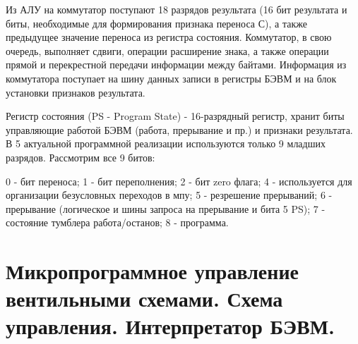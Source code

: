 \documentclass{article}
\begin{document}
Из АЛУ на коммутатор поступают 18 разрядов результата (16 бит результата и биты, необходимые для формирования признака переноса С), а также предыдущее значение переноса из регистра состояния. Коммутатор, в свою очередь, выполняет сдвиги, операции расширение знака, а также операции прямой и перекрестной передачи информации между байтами.
 Информация из коммутатора поступает на шину данных записи в регистры БЭВМ и на блок установки признаков результата. 


Регистр состояния (PS - Program State) - 16-разрядный регистр, хранит биты управляющие работой БЭВМ (работа, прерывание и пр.) и признаки результата. В 5
актуальной программной реализации используются только 9 младших разрядов. Рассмотрим все 9 битов:

0 - бит переноса; 1 - бит переполнения; 2 - бит zero флага; 4 - используется для организации безусловных переходов в мпу; 5 - резрешение прерываний; 6 - прерывание (логическое и шины запроса на прерывание и бита 5 PS); 7 - состояние тумблера работа/останов; 8 - программа.



\section{Микропрограммное управление вентильными схемами. Схема управления. Интерпретатор БЭВМ.}
\end{document}
